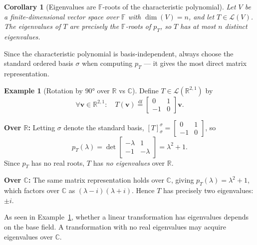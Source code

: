 \documentclass[11pt, a4paper, notitlepage]{report}
\newtheorem{corollary}[theorem]{Corollary}
\theoremstyle{definition}
\newtheorem{example}[theorem]{Example}
\theoremstyle{remark}
\begin{document}
\begin{corollary}[Eigenvalues are $\mathbb{F}$-roots of the characteristic polynomial]\label{cor:eigenvalues-roots}
Let $V$ be a finite-dimensional vector space over $\mathbb{F}$ with $\dim(V) = n$, and let
$T \in \mathcal{L}(V)$. The eigenvalues of $T$ are precisely the $\mathbb{F}$-roots of
$p_T$, so $T$ has \emph{at most $n$ distinct eigenvalues}.
\end{corollary}

\begin{examtip}[title={Exam Tip: Choice of Basis for Computing Eigenvalues}]
Since the characteristic polynomial is basis-independent, always choose the standard ordered
basis $\sigma$ when computing $p_T$ — it gives the most direct matrix representation.
\end{examtip}

\begin{example}[Rotation by $90°$ over $\mathbb{R}$ vs $\mathbb{C}$]\label{ex:rotation-eigenvalues}
Define $T \in \mathcal{L}(\mathbb{R}^{2,1})$ by
\[
  \forall \mathbf{v} \in \mathbb{R}^{2,1} : \quad
  T(\mathbf{v}) \stackrel{\mathrm{df}}{=}
  \begin{bmatrix} 0 & 1 \\ -1 & 0 \end{bmatrix}\mathbf{v}.
\]

\textbf{Over $\mathbb{R}$:} Letting $\sigma$ denote the standard basis, $[T]_\sigma^\sigma =
\begin{bmatrix}0&1\\-1&0\end{bmatrix}$, so
\[
  p_T(\lambda) = \det\begin{bmatrix}-\lambda & 1 \\ -1 & -\lambda\end{bmatrix}
  = \lambda^2 + 1.
\]
Since $p_T$ has no real roots, $T$ has \emph{no eigenvalues} over $\mathbb{R}$.

\textbf{Over $\mathbb{C}$:} The same matrix representation holds over $\mathbb{C}$, giving
$p_T(\lambda) = \lambda^2 + 1$, which factors over $\mathbb{C}$ as $(\lambda - i)(\lambda + i)$.
Hence $T$ has precisely two eigenvalues: $\pm i$.
\end{example}

\begin{warning}[title={Warning: Eigenvalues Are Field-Specific}]
As seen in Example~\ref{ex:rotation-eigenvalues}, whether a linear transformation has
eigenvalues depends on the base field. A transformation with no real eigenvalues may acquire
eigenvalues over $\mathbb{C}$.
\end{warning}
\end{document}
